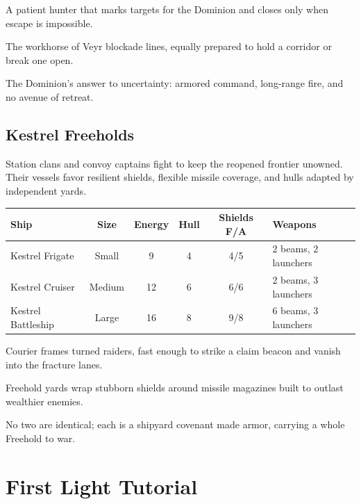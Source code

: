 \begin{description}[style=nextline,leftmargin=0pt]
  \item[Veyr Frigate] A patient hunter that marks targets for the Dominion and closes only when escape is impossible.
  \item[Veyr Cruiser] The workhorse of Veyr blockade lines, equally prepared to hold a corridor or break one open.
  \item[Veyr Battleship] The Dominion's answer to uncertainty: armored command, long-range fire, and no avenue of retreat.
\end{description}

\section{Kestrel Freeholds}

Station clans and convoy captains fight to keep the reopened frontier unowned. Their vessels favor resilient shields, flexible missile coverage, and hulls adapted by independent yards.

\begin{tabularx}{\linewidth}{l c c c c Y}\toprule
Ship & Size & Energy & Hull & Shields F/A & Weapons\\\midrule
Kestrel Frigate & Small & 9 & 4 & 4/5 & 2 beams, 2 launchers\\
Kestrel Cruiser & Medium & 12 & 6 & 6/6 & 2 beams, 3 launchers\\
Kestrel Battleship & Large & 16 & 8 & 9/8 & 6 beams, 3 launchers\\\bottomrule
\end{tabularx}

\begin{description}[style=nextline,leftmargin=0pt]
  \item[Kestrel Frigate] Courier frames turned raiders, fast enough to strike a claim beacon and vanish into the fracture lanes.
  \item[Kestrel Cruiser] Freehold yards wrap stubborn shields around missile magazines built to outlast wealthier enemies.
  \item[Kestrel Battleship] No two are identical; each is a shipyard covenant made armor, carrying a whole Freehold to war.
\end{description}

\chapter{First Light Tutorial}

